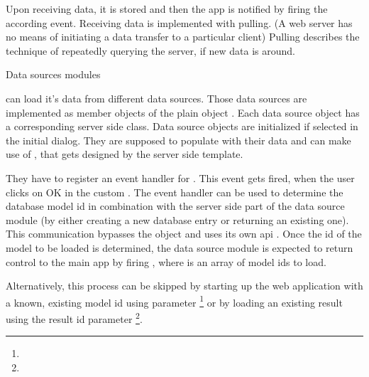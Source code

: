 Upon receiving data, it is stored and then the app is notified by firing the according event. Receiving data is implemented with pulling. (A web server has no means of initiating a data transfer to a particular client) Pulling describes the technique of repeatedly querying the server, if new data is around.


Data sources modules

\spl can load it's data from different data sources.
Those data sources are implemented as member objects of the plain object .
Each data source object has a corresponding server side class.
Data source objects are initialized if selected in the initial dialog.
They are supposed to populate  with their data and can make use of , that gets designed by the server side template.

They have to register an event handler for .
This event gets fired, when the user clicks on OK in the custom .
The event handler can be used to determine the database model id in combination with the server side part of the data source module (by either creating a new database entry or returning an existing one). This communication bypasses the  object and uses its own api .
Once the id of the model to be loaded is determined, the data source module is expected to return control to the main app by firing , where  is an array of model ids to load.

Alternatively, this process can be skipped by starting up the web application with a known, existing model id using  parameter \footnote{\splurl[?mid=42]} or by loading an existing result using the result id  parameter \footnote{\splurl[?rid=1337]}.



